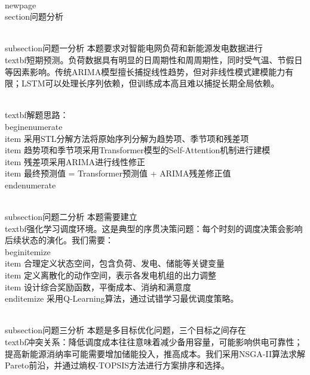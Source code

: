 \\newpage
\\section{问题分析}

\\subsection{问题一分析}
本题要求对智能电网负荷和新能源发电数据进行\\textbf{短期预测}。负荷数据具有明显的日周期性和周周期性，同时受气温、节假日等因素影响。传统ARIMA模型擅长捕捉线性趋势，但对非线性模式建模能力有限；LSTM可以处理长序列依赖，但训练成本高且难以捕捉长期全局依赖。

\\textbf{解题思路}：
\\begin{enumerate}
    \\item 采用STL分解方法将原始序列分解为趋势项、季节项和残差项
    \\item 趋势项和季节项采用Transformer模型的Self-Attention机制进行建模
    \\item 残差项采用ARIMA进行线性修正
    \\item 最终预测值 = Transformer预测值 + ARIMA残差修正值
\\end{enumerate}

\\subsection{问题二分析}
本题需要建立\\textbf{强化学习调度环境}。这是典型的序贯决策问题：每个时刻的调度决策会影响后续状态的演化。我们需要：
\\begin{itemize}
    \\item 合理定义状态空间，包含负荷、发电、储能等关键变量
    \\item 定义离散化的动作空间，表示各发电机组的出力调整
    \\item 设计综合奖励函数，平衡成本、消纳和满意度
\\end{itemize}
采用Q-Learning算法，通过试错学习最优调度策略。

\\subsection{问题三分析}
本题是多目标优化问题，三个目标之间存在\\textbf{冲突关系}：降低调度成本往往意味着减少备用容量，可能影响供电可靠性；提高新能源消纳率可能需要增加储能投入，推高成本。我们采用NSGA-II算法求解Pareto前沿，并通过熵权-TOPSIS方法进行方案排序和选择。
